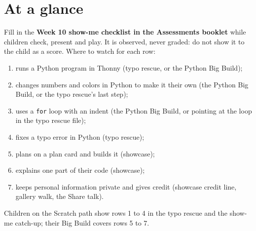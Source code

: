 \section{At a glance}
\begin{timeplan}
\end{timeplan}

\begin{teachernote}
Fill in the \textbf{Week 10 show-me checklist in the Assessments booklet} while children check, present and play. It is observed, never graded: do not show it to the child as a score. Where to watch for each row:
\begin{enumerate}[leftmargin=1.4em,itemsep=0pt]
  \item runs a Python program in Thonny (typo rescue, or the Python Big Build);
  \item changes numbers and colors in Python to make it their own (the Python Big Build, or the typo rescue's last step);
  \item uses a \texttt{for} loop with an indent (the Python Big Build, or pointing at the loop in the typo rescue file);
  \item fixes a typo error in Python (typo rescue);
  \item plans on a plan card and builds it (showcase);
  \item explains one part of their code (showcase);
  \item keeps personal information private and gives credit (showcase credit line, gallery walk, the Share talk).
\end{enumerate}
Children on the Scratch path show rows 1 to 4 in the typo rescue and the show-me catch-up; their Big Build covers rows 5 to 7.
\end{teachernote}

